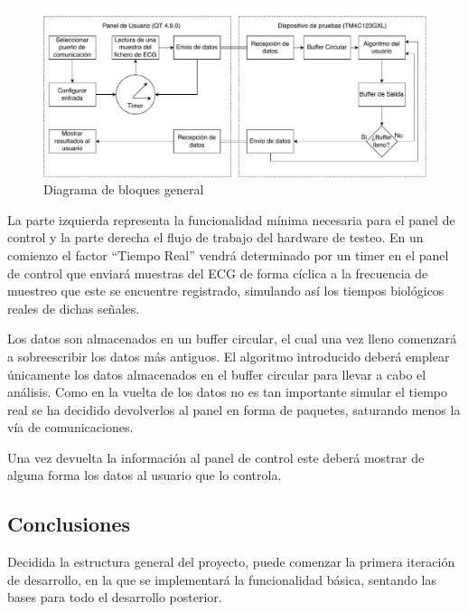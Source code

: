         \begin{figure}[H]  
            \centering
                \includegraphics[width =\linewidth]{figuras/InternBlockDiagram.pdf}
                \caption{Diagrama de bloques general}
                \label{fig:InternalBlocksDiagram}
        \end{figure}
 
        La parte izquierda representa la funcionalidad mínima necesaria para el panel de control y la parte derecha el flujo de trabajo del hardware de testeo. En un comienzo el factor “Tiempo Real” vendrá determinado por un timer en el panel de control que enviará muestras del ECG de forma cíclica a la frecuencia de muestreo que este se encuentre registrado, simulando así los tiempos biológicos reales de dichas señales. 
        
        Los datos son almacenados en un buffer circular, el cual una vez lleno comenzará a sobreescribir los datos más antiguos. El algoritmo introducido deberá emplear únicamente los datos almacenados en el buffer circular para llevar a cabo el análisis. Como en la vuelta de los datos no es tan importante simular el tiempo real se ha decidido devolverlos al panel en forma de paquetes, saturando menos la vía de comunicaciones.
        
        Una vez devuelta la información al panel de control este deberá mostrar de alguna forma los datos al usuario que lo controla.        

        \subsection{Conclusiones}

        Decidida la estructura general del proyecto, puede comenzar la primera iteración de desarrollo, en la que se implementará la funcionalidad básica, sentando las bases para todo el desarrollo posterior.
